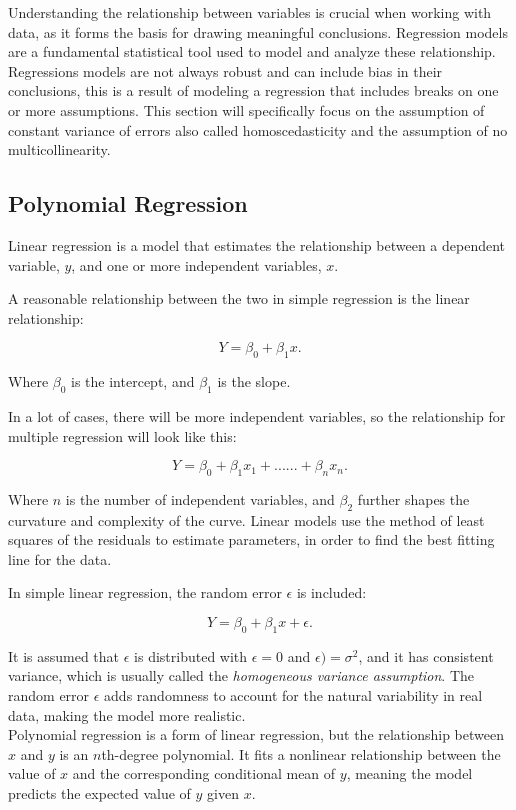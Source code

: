 Understanding the relationship between variables is crucial when working with data, as it forms the basis for drawing meaningful conclusions. Regression models are a fundamental statistical tool used to model and analyze these relationship. Regressions models are not always robust and can include bias in their conclusions, this is a result of modeling a regression that includes breaks on one or more assumptions. This section will specifically focus on the assumption of constant variance of errors also called homoscedasticity and the assumption of no multicollinearity.
\subsection*{Polynomial Regression}
Linear regression is a model that estimates the relationship between a dependent variable, \( y \), and one or more independent variables, \( x \).

\noindent A reasonable relationship between the two in simple regression is the linear relationship:

\[
Y = \beta_0 + \beta_1 x .
\]

\noindent Where \( \beta_0 \) is the intercept, and \( \beta_1 \) is the slope.

\noindent In a lot of cases, there will be more independent variables, so the relationship for multiple regression will look like this:

\[
Y = \beta_0 + \beta_1 x_1 + ......+ \beta_n x_n .
\]



\noindent Where \( n \) is the number of independent variables, and $\beta_2$ further shapes the curvature and complexity of the curve. Linear models use the method of least squares of the residuals to estimate parameters, in order to find the best fitting line for the data.

\noindent In simple linear regression, the random error \( \epsilon \) is included:

\[
Y = \beta_0 + \beta_1 x + \epsilon .
\]

\noindent It is assumed that \( \epsilon \) is distributed with $\epsilon = 0$ and $\epsilon) = \sigma^2$, and it has consistent variance, which is usually called the \textit{homogeneous variance assumption}. The random error \( \epsilon \) adds randomness to account for the natural variability in real data, making the model more realistic.
\newline\\
Polynomial regression is a form of linear regression, but the relationship between \( x \) and \( y \) is an \( n \)th-degree polynomial. It fits a nonlinear relationship between the value of \( x \) and the corresponding conditional mean of \( y \), meaning the model predicts the expected value of \( y \) given \( x \). \newline

